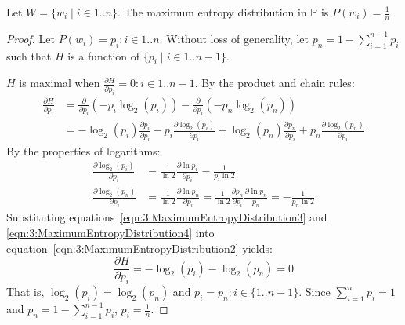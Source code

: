 \begin{thm}
  \label{thm:3:MaximumEntropyDistribution}
  Let $W=\{w_i \mid i \in 1 .. n\}$.
  The maximum entropy distribution in $\mathbb{P}$ is $P(w_i) = \frac{1}{n}$.
  \begin{proof}
    Let $P(w_i) = p_i : i\in 1 .. n$.
    Without loss of generality, let $p_n = 1 - \sum_{i = 1}^{n - 1} p_i$ such
    that $H$ is a function of
    $\{p_i \mid i \in 1 .. n - 1\}$.

    $H$ is maximal when $\frac{\partial H}{\partial p_i} = 0 : i \in 1 .. n - 1$.
    By the product and chain rules:
    \begin{align}
      \frac{\partial H}{\partial p_i}
       & = \frac{\partial}{\partial p_i}(- p_i \log_2(p_i))
      - \frac{\partial}{\partial p_i}(- p_n \log_2(p_n))
      \label{eqn:3:MaximumEntropyDistribution1}             \\
       & = -\log_2(p_i) \frac{\partial p_i}{\partial p_i}
      - p_i \frac{\partial \log_2(p_i)}{\partial p_i}
      + \log_2(p_n) \frac{\partial p_n}{\partial p_i}
      + p_n \frac{\partial \log_2(p_n)}{\partial p_i}
      \label{eqn:3:MaximumEntropyDistribution2}
    \end{align}
    By the properties of logarithms:
    \begin{align}
      \frac{\partial \log_2(p_i)}{\partial p_i}
       & = \frac{1}{\ln 2} \frac{\partial \ln p_i}{\partial p_i}
      = \frac{1}{p_i \ln 2}
      \label{eqn:3:MaximumEntropyDistribution3}                  \\
      \frac{\partial \log_2(p_n)}{\partial p_i}
       & = \frac{1}{\ln 2} \frac{\partial \ln p_n}{\partial p_i}
      = \frac{1}{\ln 2} \frac{\partial p_n}{\partial p_i} \frac{\partial \ln p_n}{p_n}
      = - \frac{1}{p_n \ln 2}
      \label{eqn:3:MaximumEntropyDistribution4}
    \end{align}
    Substituting equations~\ref{eqn:3:MaximumEntropyDistribution3} and
    \ref{eqn:3:MaximumEntropyDistribution4} into
    equation~\ref{eqn:3:MaximumEntropyDistribution2} yields:
    \begin{equation}
      \frac{\partial H}{\partial p_i} = - \log_2(p_i) - \log_2(p_n) = 0
    \end{equation}
    That is, $\log_2(p_i) = \log_2(p_n)$ and $p_i = p_n : i \in \{ 1 .. n - 1 \}$.
    Since $\sum_{i = 1}^{n} p_i = 1$ and $p_n = 1 - \sum_{i = 1}^{n - 1} p_i$,
    $p_i = \frac{1}{n}$.
  \end{proof}
\end{thm}

